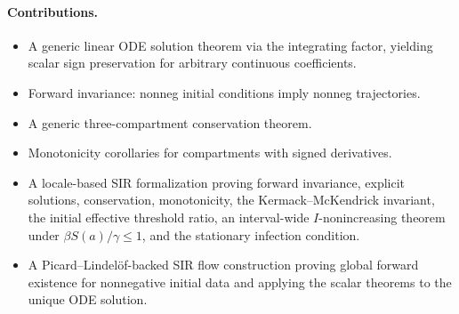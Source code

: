 \documentclass[11pt,a4paper]{article}
\begin{document}
\paragraph{Contributions.}
\begin{itemize}
\item A generic linear ODE solution theorem via the integrating factor,
      yielding scalar sign preservation for arbitrary continuous coefficients.
\item Forward invariance: nonneg initial conditions imply nonneg trajectories.
\item A generic three-compartment conservation theorem.
\item Monotonicity corollaries for compartments with signed derivatives.
\item A locale-based SIR formalization proving forward invariance, explicit
      solutions, conservation, monotonicity, the Kermack--McKendrick invariant,
      the initial effective threshold ratio, an interval-wide \(I\)-nonincreasing
      theorem under \(\beta S(a)/\gamma \le 1\), and the stationary infection
      condition.
\item A Picard--Lindel\"of-backed SIR flow construction proving global forward
      existence for nonnegative initial data and applying the scalar theorems
      to the unique ODE solution.
\end{itemize}





\end{document}
